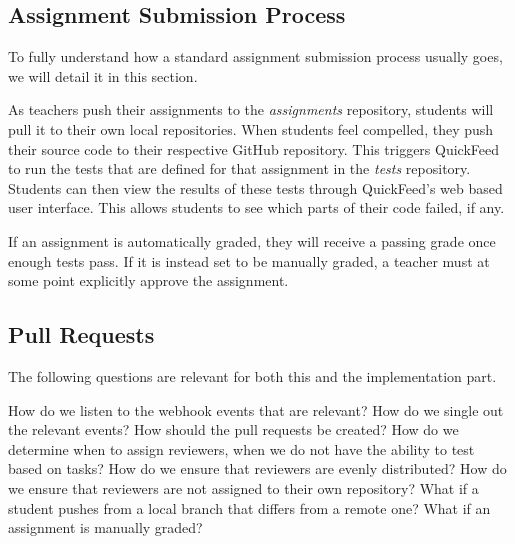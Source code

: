 \subsection{Assignment Submission Process}

To fully understand how a standard assignment submission process usually goes, we will detail it in this section.

As teachers push their assignments to the \textit{assignments} repository, students will pull it to their own local repositories.
When students feel compelled, they push their source code to their respective GitHub repository.
This triggers QuickFeed to run the tests that are defined for that assignment in the \textit{tests} repository.
Students can then view the results of these tests through QuickFeed's web based user interface.  
This allows students to see which parts of their code failed, if any.

If an assignment is automatically graded, they will receive a passing grade once enough tests pass.
If it is instead set to be manually graded, a teacher must at some point explicitly approve the assignment.

\subsection{Pull Requests}

The following questions are relevant for both this and the implementation part.

How do we listen to the webhook events that are relevant?
How do we single out the relevant events?
How should the pull requests be created?
How do we determine when to assign reviewers, when we do not have the ability to test based on tasks?
How do we ensure that reviewers are evenly distributed?
How do we ensure that reviewers are not assigned to their own repository?
What if a student pushes from a local branch that differs from a remote one?
What if an assignment is manually graded?
